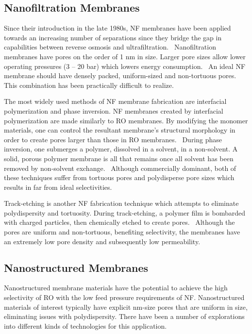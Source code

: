   \subsection{Nanofiltration Membranes}

  Since their introduction in the late 1980s, NF membranes have been applied towards
  an increasing number of separations since they bridge the gap in capabilities
  between reverse osmosis and ultrafiltration.~\cite{eriksson_nanofiltration_1988}
  Nanofiltration membranes have pores on the order of 1 nm in size. Larger pore sizes
  allow lower operating pressures (3 -- 20 bar) which lowers energy consumption.~\cite{van_der_bruggen_review_2003}
  An ideal NF membrane should have densely packed, uniform-sized and non-tortuous 
  pores.~\cite{jackson_nanoporous_2010} This combination has been practically difficult to realize.
  
  The most widely used methods of NF membrane fabrication are interfacial polymerization
  and phase inversion. NF membranes created by interfacial polymerization are made similarly
  to RO membranes. By modifying the monomer materials, one can control the resultant
  membrane's structural morphology in order to create pores larger than those in RO 
  membranes.~\cite{seman_nanofiltration_2010} During phase inversion, one submerges a 
  polymer, dissolved in a solvent, in a non-solvent. A solid, porous polymer membrane 
  is all that remains once all solvent has been removed by non-solvent exchange.~\cite{smolders_microstructures_1992}
  Although commercially dominant, both of these techniques suffer from tortuous pores
  and polydisperse pore sizes which results in far from ideal selectivities.
    
  Track-etching is another NF fabrication technique which attempts to eliminate 
  polydispersity and tortuosity. During track-etching, a polymer film is bombarded with 
  charged particles, then chemically etched to create pores.~\cite{apel_track_2001}
  Although the pores are uniform and non-tortuous, benefiting selectivity, the 
  membranes have an extremely low pore density and subsequently low permeability. 
  
  \subsection{Nanostructured Membranes}
  
  Nanostructured membrane materials have the potential to achieve the high selectivity
  of RO with the low feed pressure requirements of NF. Nanostructured materials of 
  interest typically have explicit nm-size pores that are uniform in size, eliminating
  issues with polydispersity. There have been a number of explorations into different
  kinds of technologies for this application.
  
